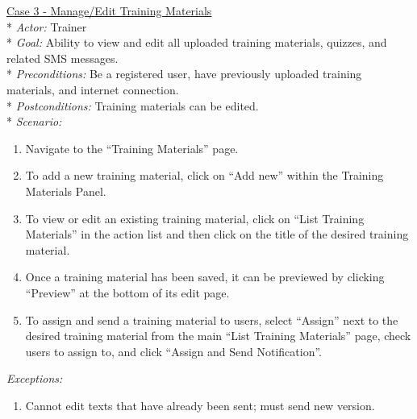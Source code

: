 \underline{Case 3 - Manage/Edit Training Materials}\\*
\textit{Actor:} Trainer\\*
\textit{Goal:} Ability to view and edit all uploaded training materials, quizzes, and related SMS messages.\\*
\textit{Preconditions:} Be a registered user, have previously uploaded training materials, and internet connection.\\*
\textit{Postconditions:} Training materials can be edited.\\*
\textit{Scenario:}
\begin{enumerate}
	\item{Navigate to the ``Training Materials'' page.}
	\item{To add a new training material, click on ``Add new'' within the Training Materials Panel.}
	\item{To view or edit an existing training material, click on ``List Training Materials'' in the action list and then click on the title of the desired training material.}
	\item{Once a training material has been saved, it can be previewed by clicking ``Preview'' at the bottom of its edit page.}
	\item{To assign and send a training material to users, select ``Assign'' next to the desired training material from the main ``List Training Materials'' page, check users to assign to, and click ``Assign and Send Notification''.}
\end{enumerate}
\textit{Exceptions:}
\begin{enumerate}
	\item{Cannot edit texts that have already been sent; must send new version.}\\
\end{enumerate}

